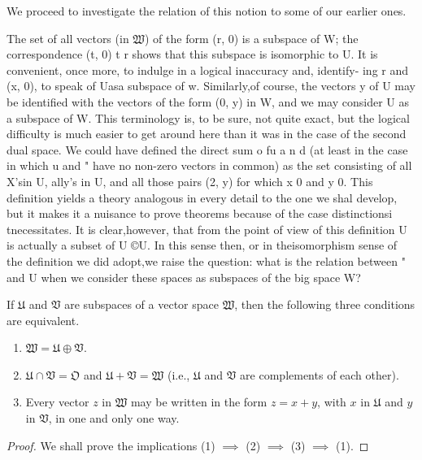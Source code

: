 We proceed to investigate the relation of this notion to some of our earlier ones.

The set of all vectors (in \(\mathfrak{W}\)) of the form (r, 0) is a subspace of W;
the correspondence (t, 0) t r shows that this subspace is isomorphic to U. It is
convenient, once more, to indulge in a logical inaccuracy and, identify- ing r
and (x, 0), to speak of Uasa subspace of w. Similarly,of course, the vectors y
of U may be identified with the vectors of the form (0, y) in W, and we may
consider U as a subspace of W. This terminology is, to be sure, not quite exact,
but the logical difficulty is much easier to get around here than it was in the
case of the second dual space. We could have defined the direct sum o fu a n d
(at least in the case in which u and " have no non-zero vectors in common) as
the set consisting of all
X'sin U, ally's in U, and all those pairs (2, y) for which x 0 and y 0. This definition yields a theory analogous in every detail to the one we shal develop, but it makes it a nuisance to prove theorems because of the case distinctionsi tnecessitates. It is clear,however, that from the point of view of this definition U is actually a subset of U ©U. In this sense
then, or in theisomorphism sense of the definition we did adopt,we raise the question: what is the relation between " and U when we consider these
spaces as subspaces of the big space W?

\begin{thmx}
    If \(\mathfrak{U}\) and \(\mathfrak{V}\) are subspaces of a vector space \(\mathfrak{W}\), then the following three conditions are equivalent.
    \begin{enumerate}[wide, nosep, label=(\arabic*)]
        \item \(\mathfrak{W} = \mathfrak{U} \oplus \mathfrak{V}\).
        \item \(\mathfrak{U} \cap \mathfrak{V} = \mathfrak{O}\) and \(\mathfrak{U} + \mathfrak{V} = \mathfrak{W}\) (i.e., \(\mathfrak{U}\) and \(\mathfrak{V}\) are complements of each other).
        \item Every vector \(z\) in \(\mathfrak{W}\) may be written in the form \(z = x+y\), with \(x\) in \(\mathfrak{U}\) and \(y\) in \(\mathfrak{V}\), in one and only one way.
    \end{enumerate}
\end{thmx}

\begin{proof}
    We shall prove the implications (1) \(\implies\) (2) \(\implies\) (3) \(\implies\) (1).
\end{proof}

